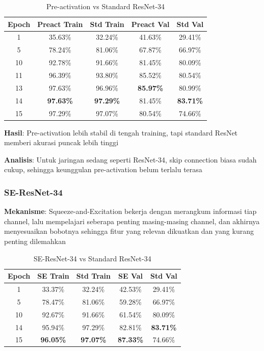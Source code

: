 \begin{table}[h]
\centering
\caption{Pre-activation vs Standard ResNet-34}
\scriptsize
\begin{tabular}{|c|c|c|c|c|}
\hline
\textbf{Epoch} & \textbf{Preact Train} & \textbf{Std Train} & \textbf{Preact Val} & \textbf{Std Val} \\
\hline
1  & 35.63\% & 32.24\% & 41.63\% & 29.41\% \\
5  & 78.24\% & 81.06\% & 67.87\% & 66.97\% \\
10 & 92.78\% & 91.66\% & 81.45\% & 80.09\% \\
11 & 96.39\% & 93.80\% & 85.52\% & 80.54\% \\
13 & 97.63\% & 96.96\% & \textbf{85.97\%} & 80.99\% \\
14 & \textbf{97.63\%} & \textbf{97.29\%} & 81.45\% & \textbf{83.71\%} \\
15 & 97.29\% & 97.07\% & 80.54\% & 74.66\% \\
\hline
\end{tabular}
\end{table}

\textbf{Hasil}: Pre-activation lebih stabil di tengah training, tapi standard ResNet memberi akurasi puncak lebih tinggi

\textbf{Analisis}: Untuk jaringan sedang seperti ResNet-34, skip connection biasa sudah cukup, sehingga keunggulan pre-activation belum terlalu terasa

\subsubsection{SE-ResNet-34}

\textbf{Mekanisme}: Squeeze-and-Excitation bekerja dengan merangkum informasi tiap channel, lalu mempelajari seberapa penting masing-masing channel, dan akhirnya menyesuaikan bobotnya sehingga fitur yang relevan dikuatkan dan yang kurang penting dilemahkan

\begin{table}[h]
\centering
\caption{SE-ResNet-34 vs Standard ResNet-34}
\scriptsize
\begin{tabular}{|c|c|c|c|c|}
\hline
\textbf{Epoch} & \textbf{SE Train} & \textbf{Std Train} & \textbf{SE Val} & \textbf{Std Val} \\
\hline
1  & 33.37\% & 32.24\% & 42.53\% & 29.41\% \\
5  & 78.47\% & 81.06\% & 59.28\% & 66.97\% \\
10 & 92.67\% & 91.66\% & 61.54\% & 80.09\% \\
14 & 95.94\% & 97.29\% & 82.81\% & \textbf{83.71\%} \\
15 & \textbf{96.05\%} & \textbf{97.07\%} & \textbf{87.33\%} & 74.66\% \\
\hline
\end{tabular}
\end{table}

